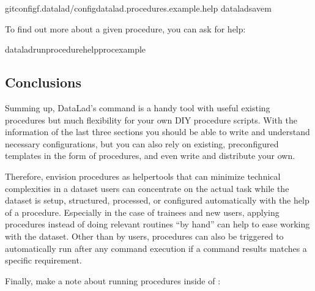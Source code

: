 \begin{sphinxVerbatim}[commandchars=\\\{\}]
gitconfig\PYGZhy{}f.datalad/configdatalad.procedures.example.help
dataladsave\PYGZhy{}m
\end{sphinxVerbatim}

\sphinxAtStartPar
To find out more about a given procedure, you can ask for help:

\begin{sphinxVerbatim}[commandchars=\\\{\}]
dataladrun\PYGZhy{}procedure\PYGZhy{}\PYGZhy{}help\PYGZhy{}procexample
\end{sphinxVerbatim}


\subsection{Conclusions}
\label{\detokenize{basics/101-124-procedures:conclusions}}
\sphinxAtStartPar
Summing up, DataLad’s  command is a handy tool
with useful existing procedures but much flexibility for your own
DIY procedure scripts. With the information of the last three sections
you should be able to write and understand necessary configurations,
but you can also rely on existing, preconfigured templates in the
form of procedures, and even write and distribute your own.

\sphinxAtStartPar
Therefore, envision procedures as
helper\sphinxhyphen{}tools that can minimize technical complexities
in a dataset \textendash{} users can concentrate on the actual task while
the dataset is set\sphinxhyphen{}up, structured, processed, or configured automatically
with the help of a procedure.
Especially in the case of trainees and new users, applying procedures
instead of doing relevant routines “by hand” can help to ease
working with the dataset. Other than by users, procedures can also be triggered to automatically
run after any command execution if a command results matches a specific
requirement.

\sphinxAtStartPar
Finally, make a note about running procedures inside of :

